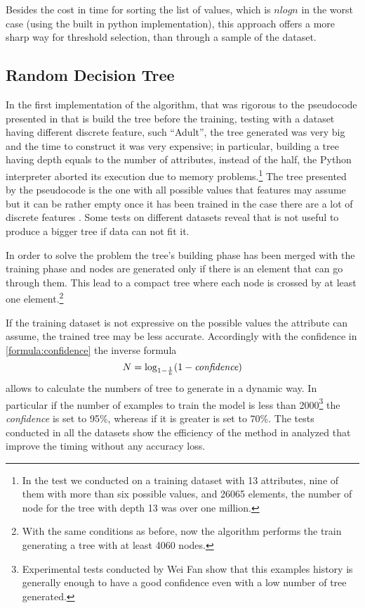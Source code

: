 \documentclass{acm_proc_article-sp-sigmod07}
\begin{document}
Besides the cost in time for sorting the list of values, which is $n log
n$ in the worst case (using the built in python implementation), this
approach offers a more sharp way for threshold selection, than through a
sample of the dataset.

\subsection{Random Decision Tree}
In the first implementation of the algorithm, that was rigorous to the
pseudocode presented in \cite{fan:rdt} that is build the tree before the
training, testing with a dataset having different discrete feature, such
``Adult'', the tree generated was very big and the time to construct it was
very expensive; in particular, building a tree having depth equals to the
number of attributes, instead of the half, the Python interpreter
aborted its execution due to memory problems.\footnote{In the test we
conducted on a training dataset with 13 attributes, nine of them with
more than six possible values, and 26065 elements, the number of node for
the tree with depth 13 was over one million.}
The tree presented by the pseudocode is the one with all possible values
that features may assume but it can be rather empty once it has been
trained in the case there are a lot of discrete features . Some tests
on different datasets reveal that is not useful to produce a bigger tree if
data can not fit it.

In order to solve the problem the tree's building phase has been merged
with the training phase and nodes are generated only if there is an element
that can go through them. This lead to a compact tree where
each node is crossed by at least one element.\footnote{With the same
conditions as before, now the algorithm performs the train generating a
tree with at least 4060 nodes.}

If the training dataset is not expressive on the possible values
the attribute can assume, the trained tree may be less accurate.
Accordingly with the confidence in \ref{formula:confidence} the inverse
formula
\begin{equation}
\label{formula:N_generate}
N = \log_{1-\frac{1}{k}}({1 - \emph{confidence}})
\end{equation}
allows to calculate the numbers of tree to generate in a dynamic way. In
 particular if the number of examples to train the model is less than
2000\footnote{Experimental tests conducted by Wei Fan show that this
examples history is generally enough to have a good confidence even with a
low number of tree generated.} the \emph{confidence} is set to 95\%,
whereas if it is greater is set to 70\%. The tests conducted in all the
datasets show the efficiency of the method in analyzed that improve the
timing without any accuracy loss.
\end{document}

